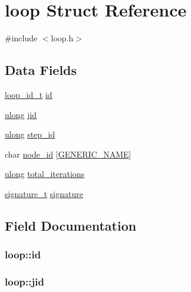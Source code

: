 \hypertarget{structloop}{}\section{loop Struct Reference}
\label{structloop}


{\ttfamily \#include $<$loop.\+h$>$}

\subsection*{Data Fields}
\begin{DoxyCompactItemize}
\item 
\hyperlink{loop_8h_a4c055b277136987486c9d9a29e765e1c}{loop\+\_\+id\+\_\+t} \hyperlink{structloop_a5664344aa21bb24506ecbc3bae9f4947}{id}
\item 
\hyperlink{generic_8h_a718b4eb2652c286f4d42dc18a8e71a1a}{ulong} \hyperlink{structloop_ab4d838d7bbee32fbb46bf392c8076edf}{jid}
\item 
\hyperlink{generic_8h_a718b4eb2652c286f4d42dc18a8e71a1a}{ulong} \hyperlink{structloop_a401564bb9ea5a527ed87afaaef275076}{step\+\_\+id}
\item 
char \hyperlink{structloop_a8dc54b761e65cb2099c82172bbe34111}{node\+\_\+id} \mbox{[}\hyperlink{loop_8h_a6b0b8b14cfc75447be8feba3efe18da8}{G\+E\+N\+E\+R\+I\+C\+\_\+\+N\+A\+ME}\mbox{]}
\item 
\hyperlink{generic_8h_a718b4eb2652c286f4d42dc18a8e71a1a}{ulong} \hyperlink{structloop_a330a0dd141e72128f60395a832a289eb}{total\+\_\+iterations}
\item 
\hyperlink{signature_8h_a3387c90f9aa9243c926866ee8ce61917}{signature\+\_\+t} \hyperlink{structloop_a05119bc29e5aeea874b779eae1a9c1a5}{signature}
\end{DoxyCompactItemize}


\subsection{Field Documentation}
\subsubsection[{\texorpdfstring{id}{id}}]{ loop\+::id}\hypertarget{structloop_a5664344aa21bb24506ecbc3bae9f4947}{}\label{structloop_a5664344aa21bb24506ecbc3bae9f4947}
\subsubsection[{\texorpdfstring{jid}{jid}}]{ loop\+::jid}\hypertarget{structloop_ab4d838d7bbee32fbb46bf392c8076edf}{}\label{structloop_ab4d838d7bbee32fbb46bf392c8076edf}

